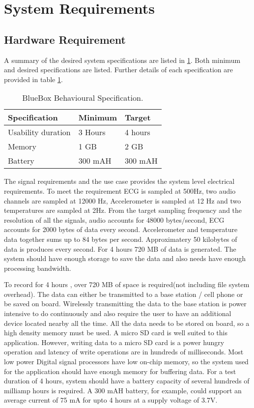 \section{System Requirements}\label{system requirements}
\subsection{Hardware Requirement}

A summary of the desired system specifications are listed in \ref{table:Behavioural_specs}. Both minimum and desired specifications are listed. Further details of each specification are provided in table \ref{table:Behavioural_specs}.
\begin{table}[h]
	\centering
	\begin{tabular}{|l|l|l|}
		\hline
		Specification & Minimum & Target \\
		\hline
		Usability duration  &  3 Hours & 4 hours \\
		Memory & 1 GB & 2 GB \\
		Battery & 300 mAH & 300 mAH \\
		\hline
	\end{tabular}
	\caption{BlueBox Behavioural Specification.}
	\label{table:Behavioural_specs}
\end{table}

\hspace{10mm}The signal requirements and the use case  provides the system level electrical requirements.  To meet the requirement ECG is sampled at 500Hz, two audio channels are sampled at 12000 Hz, Accelerometer is sampled at 12 Hz and two temperatures are sampled at 2Hz. From the target sampling frequency and the resolution of all the signals, audio accounts for 48000 bytes/second, ECG accounts for 2000 bytes of data every second. Accelerometer and temperature data together sums up to 84 bytes per second. Approximatery 50 kilobytes of data is produces every second. For 4 hours 720 MB of data is generated. The system should have enough storage to save the data and also needs have enough processing bandwidth. 

\hspace{10mm} To record for 4 hours , over 720 MB of space is required(not including file system overhead). The data can either be transmitted to a base station / cell phone or be saved on board. Wirelessly transmitting the data to the base station is power intensive to do continuously and also require the user to have an additional device located nearby all the time. All the data needs to be stored on board, so a high density memory must be used. A micro SD card is well suited to this application. However, writing data to a micro SD card is a power hungry operation and latency of write operations are in hundreds of milliseconds. Most low power Digital signal processors have low on-chip memory, so the system used for the application should have enough memory for buffering data. For a test duration of 4 hours, system should have a battery capacity of several hundreds of milliamp hours is required. A 300 mAH battery, for example, could support an average current of 75 mA for upto 4 hours at a supply voltage of 3.7V. 

